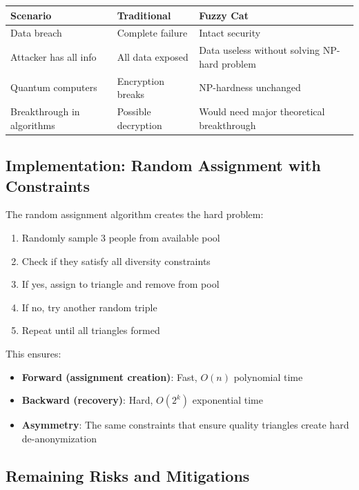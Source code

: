 \documentclass[12pt,a4paper]{article}
\theoremstyle{definition}
\begin{document}
{\begin{table}[H]
\centering
\begin{tabular}{|l|l|l|}
\hline
\textbf{Scenario} & \textbf{Traditional} & \textbf{Fuzzy Cat} \\
\hline
Data breach & Complete failure & Intact security \\
\hline
Attacker has all info & All data exposed & Data useless without solving NP-hard problem \\
\hline
Quantum computers & Encryption breaks & NP-hardness unchanged \\
\hline
Breakthrough in algorithms & Possible decryption & Would need major theoretical breakthrough \\
\hline
\end{tabular}
\end{table}

\subsection{Implementation: Random Assignment with Constraints}

The random assignment algorithm creates the hard problem:

\begin{enumerate}
    \item Randomly sample 3 people from available pool
    \item Check if they satisfy all diversity constraints
    \item If yes, assign to triangle and remove from pool
    \item If no, try another random triple
    \item Repeat until all triangles formed
\end{enumerate}

This ensures:
\begin{itemize}
    \item \textbf{Forward (assignment creation)}: Fast, $O(n)$ polynomial time
    \item \textbf{Backward (recovery)}: Hard, $O(2^k)$ exponential time
    \item \textbf{Asymmetry}: The same constraints that ensure quality triangles create hard de-anonymization
\end{itemize}

\subsection{Remaining Risks and Mitigations}

}
\end{document}
